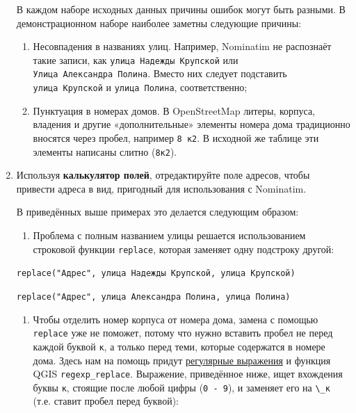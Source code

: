 \documentclass[
  12pt,
]{book}
\providecommand{\tightlist}{%
  \setlength{\itemsep}{0pt}\setlength{\parskip}{0pt}}
\begin{document}
\begin{enumerate}
  В каждом наборе исходных данных причины ошибок могут быть разными. В демонстрационном наборе наиболее заметны следующие причины:

  \begin{enumerate}
  \def\labelenumii{\alph{enumii}.}
  \item
    Несовпадения в названиях улиц. Например, Nominatim не распознаёт такие записи, как \texttt{улица\ Надежды\ Крупской} или \texttt{Улица\ Александра\ Полина}. Вместо них следует подставить \texttt{улица\ Крупской} и \texttt{улица\ Полина}, соответственно;
  \item
    Пунктуация в номерах домов. В OpenStreetMap литеры, корпуса, владения и другие «дополнительные» элементы номера дома традиционно вносятся через пробел, например \texttt{8\ к2}. В исходной же таблице эти элементы написаны слитно (\texttt{8к2}).
  \end{enumerate}
\item
  Используя \textbf{калькулятор полей}, отредактируйте поле адресов, чтобы привести адреса в вид, пригодный для использования с Nominatim.

  В приведённых выше примерах это делается следующим образом:

  \begin{enumerate}
  \def\labelenumii{\alph{enumii}.}
  \tightlist
  \item
    Проблема с полным названием улицы решается использованием строковой функции \texttt{replace}, которая заменяет одну подстроку другой:
  \end{enumerate}

  \texttt{replace("Адрес",\ \textquotesingle{}улица\ Надежды\ Крупской\textquotesingle{},\ \textquotesingle{}улица\ Крупской\textquotesingle{})}

  \texttt{replace("Адрес",\ \textquotesingle{}улица\ Александра\ Полина\textquotesingle{},\ \textquotesingle{}улица\ Полина\textquotesingle{})}

  \begin{enumerate}
  \def\labelenumii{\alph{enumii}.}
  \setcounter{enumii}{1}
  \tightlist
  \item
    Чтобы отделить номер корпуса от номера дома, замена с помощью \texttt{replace} уже не поможет, потому что нужно вставить пробел не перед каждой буквой \texttt{к}, а только перед теми, которые содержатся в номере дома. Здесь нам на помощь придут \href{https://ru.wikipedia.org/wiki/\%D0\%A0\%D0\%B5\%D0\%B3\%D1\%83\%D0\%BB\%D1\%8F\%D1\%80\%D0\%BD\%D1\%8B\%D0\%B5_\%D0\%B2\%D1\%8B\%D1\%80\%D0\%B0\%D0\%B6\%D0\%B5\%D0\%BD\%D0\%B8\%D1\%8F}{регулярные выражения} и функция QGIS \texttt{regexp\_replace}. Выражение, приведённое ниже, ищет вхождения буквы \texttt{к}, стоящие после любой цифры (\texttt{0\ -\ 9}), и заменяет его на \texttt{\textbackslash{}\_к} (т.е. ставит пробел перед буквой):
  \end{enumerate}


\end{enumerate}
\end{document}
